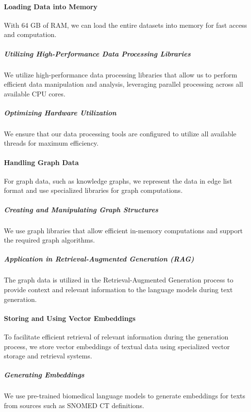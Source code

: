 \documentclass[12pt, a4paper]{article}
\begin{document}
\paragraph{Loading Data into Memory}

With 64 GB of RAM, we can load the entire datasets into memory for fast access and computation.

\subparagraph{Utilizing High-Performance Data Processing Libraries}

We utilize high-performance data processing libraries that allow us to perform efficient data manipulation and analysis, leveraging parallel processing across all available CPU cores.

\subparagraph{Optimizing Hardware Utilization}

We ensure that our data processing tools are configured to utilize all available threads for maximum efficiency.

\paragraph{Handling Graph Data}

For graph data, such as knowledge graphs, we represent the data in edge list format and use specialized libraries for graph computations.

\subparagraph{Creating and Manipulating Graph Structures}

We use graph libraries that allow efficient in-memory computations and support the required graph algorithms.

\subparagraph{Application in Retrieval-Augmented Generation (RAG)}

The graph data is utilized in the Retrieval-Augmented Generation process to provide context and relevant information to the language models during text generation.

\paragraph{Storing and Using Vector Embeddings}

To facilitate efficient retrieval of relevant information during the generation process, we store vector embeddings of textual data using specialized vector storage and retrieval systems.

\subparagraph{Generating Embeddings}

We use pre-trained biomedical language models to generate embeddings for texts from sources such as SNOMED CT definitions.
\end{document}

